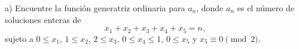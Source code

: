 a) Encuentre la función generatriz ordinaria para $a_n$, donde $a_n$ es el número de soluciones enteras de
\[x_1+x_2+x_3+x_4+x_5=n,\]
sujeto a $0\le x_1$, $1\le x_2$, $2\le x_3$, $0\le x_4\le1$, $0\le x_5$ y $x_5\equiv0\pmod2$.
